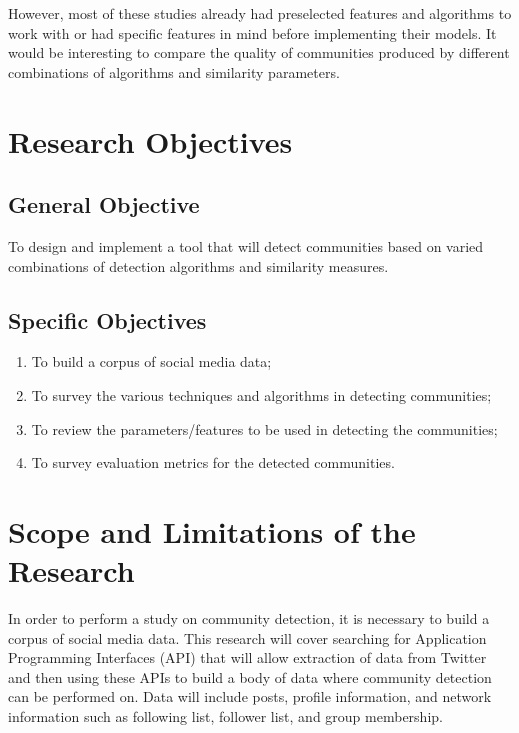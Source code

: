 However, most of these studies already had preselected features and algorithms to work with or had specific features in mind before implementing their models. It would be interesting to compare the quality of communities produced by different combinations of algorithms and similarity parameters.


\section{Research Objectives}
\label{sec:researchobjectives}




\subsection{General Objective}
\label{sec:generalobjective}




To design and implement a tool that will detect communities based on varied combinations of detection algorithms and similarity measures.




\subsection{Specific Objectives}
\label{sec:specificobjectives}




\begin{enumerate}
	\item To build a corpus of social media data;
	\item To survey the various techniques and algorithms in detecting communities;
	\item To review the parameters/features to be used in detecting the communities;
	\item To survey evaluation metrics for the detected communities.
\end{enumerate}




\section{Scope and Limitations of the Research}
\label{sec:scopelimitations}




In order to perform a study on community detection, it is necessary to build a corpus of social media data. This research will cover searching for Application Programming Interfaces (API) that will allow extraction of data from Twitter and then using these APIs to build a body of data where community detection can be performed on. Data will include posts, profile information, and network information such as following list, follower list, and group membership.




